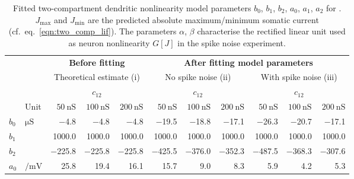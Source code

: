 
\begin{table}[p]
	\caption[Fitted two-compartment LIF dendritic nonlinearity model parameters]{Fitted two-compartment \LIF dendritic nonlinearity model parameters $b_0$, $b_1$, $b_2$, $a_0$, $a_1$, $a_2$ for .
	$J_\mathrm{max}$ and $J_\mathrm{min}$ are the predicted absolute maximum/minimum somatic current (cf.~eq.~\ref{eqn:two_comp_lif}).
	The parameters $\alpha$, $\beta$ characterise the rectified linear unit used as neuron nonlinearity $G[J]$ in the spike noise experiment.}
	\renewcommand{\arraystretch}{1.2}
	\small
	\centering
	\sffamily
	\begin{tabular}{l l   r r r   r r r   r r r}
		\toprule
			& & \multicolumn{3}{c}{\textbf{Before fitting}} & \multicolumn{6}{c}{\textbf{After fitting model parameters}} \\
		\cmidrule(l){3-5}
		\cmidrule(l){6-11}
		& & \multicolumn{3}{c}{Theoretical estimate (i)} &
		    \multicolumn{3}{c}{No spike noise (ii)} &
		    \multicolumn{3}{c}{With spike noise (iii)} \\
		\cmidrule(l){3-5}
		\cmidrule(l){6-8}
		\cmidrule(l){9-11}
		& & \multicolumn{3}{c}{$c_{12}$} &
		\multicolumn{3}{c}{$c_{12}$} &
		\multicolumn{3}{c}{$c_{12}$} \\
		& Unit &
		$\SI{50}{\nano\siemens}$ &
		$\SI{100}{\nano\siemens}$ &		
		$\SI{200}{\nano\siemens}$ &		
		$\SI{50}{\nano\siemens}$ &
		$\SI{100}{\nano\siemens}$ &
		$\SI{200}{\nano\siemens}$ &
		$\SI{50}{\nano\siemens}$ &
		$\SI{100}{\nano\siemens}$ &		
		$\SI{200}{\nano\siemens}$ \\
		\cmidrule(r){1-2}
		\cmidrule(l){3-5}
		\cmidrule(l){6-8}
		\cmidrule(l){9-11}

		$b_0$ & $\si{\micro\siemens}$ &
		\num{-4.8} & \num{-4.8} & \num{-4.8} &
		\num{-19.5} & \num{-18.8} & \num{-17.1} &
		\num{-26.3} & \num{-20.7} & \num{-17.1}
		\\

		$b_1$ & &
		\num{1000.0} & \num{1000.0} & \num{1000.0} &
		\num{1000.0} & \num{1000.0} & \num{1000.0} &
		\num{1000.0} & \num{1000.0} & \num{1000.0} \\

		$b_2$ & &
		\num{-225.8} & \num{-225.8} & \num{-225.8} &
		\num{-425.5} & \num{-376.0} & \num{-352.3} &
		\num{-487.5} & \num{-368.3} & \num{-307.6} \\

		$a_0$ & $\si{\per\milli\volt}$ &
		\num{25.8} & \num{19.4} & \num{16.1} &
		\num{15.7} & \num{9.0} & \num{8.3} &
		\num{5.9} & \num{4.2} & \num{5.3} \\


\end{tabular}
\end{table}
